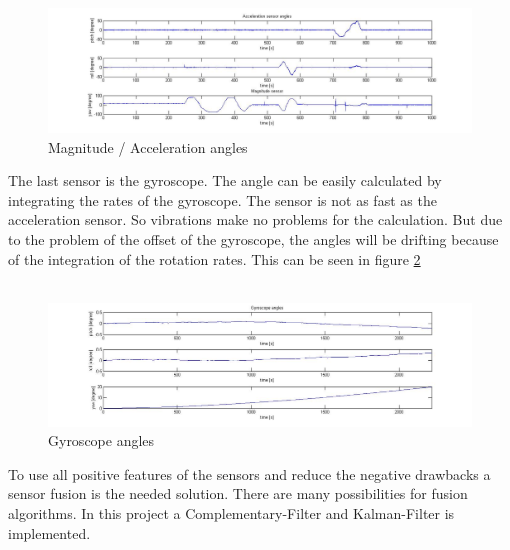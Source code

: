 \begin{figure}[H]
	\centering\includegraphics[width=1.0\textwidth]{fig/Magn_Acc.jpg}
	\caption{Magnitude / Acceleration angles}
	\label{fig:Mag_Acc}
\end{figure}

The last sensor is the gyroscope. The angle can be easily calculated by integrating the rates of the gyroscope. The sensor is not as fast as the acceleration sensor. So vibrations make no problems for the calculation. But due to the problem of the offset of the gyroscope, the angles will be drifting because of the integration of the rotation rates. This can be seen in figure \ref{fig:Comp_gyro}\\\\

\begin{figure}[H]
	\centering\includegraphics[width=1.0\textwidth]{fig/Comp_gyro.jpg}
	\caption{Gyroscope angles}
	\label{fig:Comp_gyro}
\end{figure}

To use all positive features of the sensors and reduce the negative drawbacks a sensor fusion is the needed solution. There are many possibilities for fusion algorithms. In this project a Complementary-Filter and Kalman-Filter is implemented.


